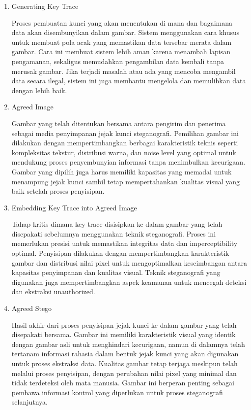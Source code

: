 \documentclass{ittelkom}
\begin{document}
\begin{enumerate}
    \item Generating Key Trace

          Proses pembuatan kunci yang akan menentukan di mana dan bagaimana data akan
          disembunyikan dalam gambar. Sistem menggunakan cara khusus untuk membuat pola
          acak yang memastikan data tersebar merata dalam gambar. Cara ini membuat sistem
          lebih aman karena menambah lapisan pengamanan, sekaligus memudahkan pengambilan
          data kembali tanpa merusak gambar. Jika terjadi masalah atau ada yang mencoba
          mengambil data secara ilegal, sistem ini juga membantu mengelola dan memulihkan
          data dengan lebih baik.

    \item Agreed Image

          Gambar yang telah ditentukan bersama antara pengirim dan penerima sebagai media
          penyimpanan jejak kunci steganografi. Pemilihan gambar ini dilakukan dengan
          mempertimbangkan berbagai karakteristik teknis seperti kompleksitas tekstur,
          distribusi warna, dan noise level yang optimal untuk mendukung proses
          penyembunyian informasi tanpa menimbulkan kecurigaan. Gambar yang dipilih juga
          harus memiliki kapasitas yang memadai untuk menampung jejak kunci sambil tetap
          mempertahankan kualitas visual yang baik setelah proses penyisipan.

    \item Embedding Key Trace into Agreed Image

          Tahap kritis dimana key trace disisipkan ke dalam gambar yang telah disepakati
          sebelumnya menggunakan teknik steganografi. Proses ini memerlukan presisi untuk
          memastikan integritas data dan imperceptibility optimal. Penyisipan dilakukan
          dengan mempertimbangkan karakteristik gambar dan distribusi nilai pixel untuk
          mengoptimalkan keseimbangan antara kapasitas penyimpanan dan kualitas visual.
          Teknik steganografi yang digunakan juga mempertimbangkan aspek keamanan untuk
          mencegah deteksi dan ekstraksi unauthorized.

    \item Agreed Stego

          Hasil akhir dari proses penyisipan jejak kunci ke dalam gambar yang telah
          disepakati bersama. Gambar ini memiliki karakteristik visual yang identik
          dengan gambar asli untuk menghindari kecurigaan, namun di dalamnya telah
          tertanam informasi rahasia dalam bentuk jejak kunci yang akan digunakan untuk
          proses ekstraksi data. Kualitas gambar tetap terjaga meskipun telah melalui
          proses penyisipan, dengan perubahan nilai pixel yang minimal dan tidak
          terdeteksi oleh mata manusia. Gambar ini berperan penting sebagai pembawa
          informasi kontrol yang diperlukan untuk proses steganografi selanjutnya.


\end{enumerate}
\end{document}
